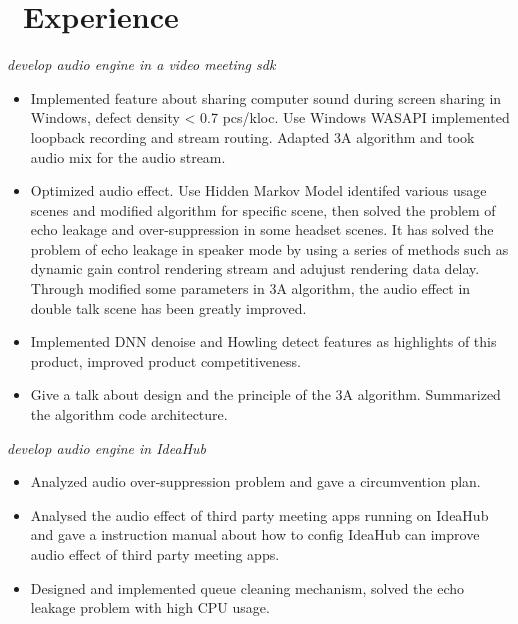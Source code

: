 \documentclass{resume}
\begin{document}
\section{\faBriefcase\ Experience}
\textit{develop audio engine in a video meeting sdk}
\begin{itemize}
  \item Implemented feature about sharing computer sound during screen sharing in Windows, defect density < 0.7 pcs/kloc. Use Windows WASAPI implemented
  loopback recording and stream routing. Adapted 3A algorithm and took audio mix for the audio stream. 
  \item Optimized audio effect. Use Hidden Markov Model identifed various usage scenes and modified algorithm for specific scene,
  then solved the problem of echo leakage and over-suppression in some headset scenes. It has solved the problem of echo leakage in speaker mode by using
  a series of methods such as dynamic gain control rendering stream and adujust rendering data delay.
  Through modified some parameters in 3A algorithm, the audio effect in double talk scene has been greatly improved.
  \item Implemented DNN denoise and Howling detect features as highlights of this product, improved product competitiveness.
  \item Give a talk about design and the principle of the 3A algorithm. Summarized the algorithm code architecture.
\end{itemize}
\textit{develop audio engine in IdeaHub}
\begin{itemize}
  \item Analyzed audio over-suppression problem and gave a circumvention plan.
  \item Analysed the audio effect of third party meeting apps running on IdeaHub and gave a instruction manual about how to config IdeaHub can improve audio effect of third party meeting apps.
  \item Designed and implemented queue cleaning mechanism, solved the echo leakage problem with high CPU usage.
\end{itemize}
\end{document}
